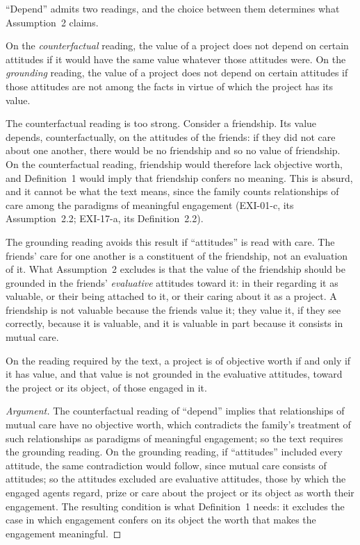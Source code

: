 
\enquote{Depend} admits two readings, and the choice between them determines what Assumption~2 claims.

On the \emph{counterfactual} reading, the value of a project does not depend on certain attitudes if it would have the same value whatever those attitudes were. On the \emph{grounding} reading, the value of a project does not depend on certain attitudes if those attitudes are not among the facts in virtue of which the project has its value.

The counterfactual reading is too strong. Consider a friendship. Its value depends, counterfactually, on the attitudes of the friends: if they did not care about one another, there would be no friendship and so no value of friendship. On the counterfactual reading, friendship would therefore lack objective worth, and Definition~1 would imply that friendship confers no meaning. This is absurd, and it cannot be what the text means, since the family counts relationships of care among the paradigms of meaningful engagement (EXI-01-c, its Assumption~2.2; EXI-17-a, its Definition~2.2).

The grounding reading avoids this result if \enquote{attitudes} is read with care. The friends' care for one another is a constituent of the friendship, not an evaluation of it. What Assumption~2 excludes is that the value of the friendship should be grounded in the friends' \emph{evaluative} attitudes toward it: in their regarding it as valuable, or their being attached to it, or their caring about it as a project. A friendship is not valuable because the friends value it; they value it, if they see correctly, because it is valuable, and it is valuable in part because it consists in mutual care.

\begin{proposition}\label{p:restricted}
On the reading required by the text, a project is of objective worth if and only if it has value, and that value is not grounded in the evaluative attitudes, toward the project or its object, of those engaged in it.
\end{proposition}

\begin{proof}[Argument]
The counterfactual reading of \enquote{depend} implies that relationships of mutual care have no objective worth, which contradicts the family's treatment of such relationships as paradigms of meaningful engagement; so the text requires the grounding reading. On the grounding reading, if \enquote{attitudes} included every attitude, the same contradiction would follow, since mutual care consists of attitudes; so the attitudes excluded are evaluative attitudes, those by which the engaged agents regard, prize or care about the project or its object as worth their engagement. The resulting condition is what Definition~1 needs: it excludes the case in which engagement confers on its object the worth that makes the engagement meaningful.
\end{proof}

